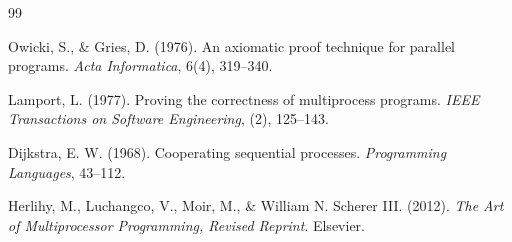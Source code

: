 \documentclass[11pt]{article}
\begin{document}
\begin{thebibliography}{99}

 Owicki, S., \& Gries, D. (1976). An axiomatic proof technique for parallel programs. \textit{Acta Informatica}, 6(4), 319--340.

 Lamport, L. (1977). Proving the correctness of multiprocess programs. \textit{IEEE Transactions on Software Engineering}, (2), 125--143.

 Dijkstra, E. W. (1968). Cooperating sequential processes. \textit{Programming Languages}, 43--112.

 Herlihy, M., Luchangco, V., Moir, M., \& William N. Scherer III. (2012). \textit{The Art of Multiprocessor Programming, Revised Reprint}. Elsevier.

\end{thebibliography}
\end{document}

